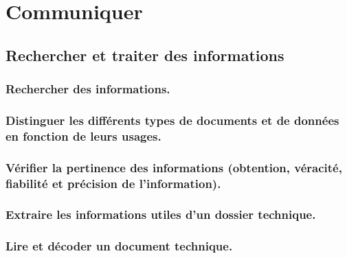 \documentclass[10pt,fleqn]{book}
\begin{document}
\chapter{Communiquer} 

\section{Rechercher et traiter des informations} 

\subsection{Rechercher des informations.} 

\begin{multicols}{2} 

\end{multicols}

\subsection{Distinguer les différents types de documents et de données en fonction de leurs usages.} 

\begin{multicols}{2} 

\end{multicols}

\subsection{Vérifier la pertinence des informations (obtention, véracité, fiabilité et précision de l'information).} 

\begin{multicols}{2} 

\end{multicols}

\subsection{Extraire les informations utiles d’un dossier technique.} 

\begin{multicols}{2} 

\end{multicols}

\subsection{Lire et décoder un document technique.} 
\end{document}
